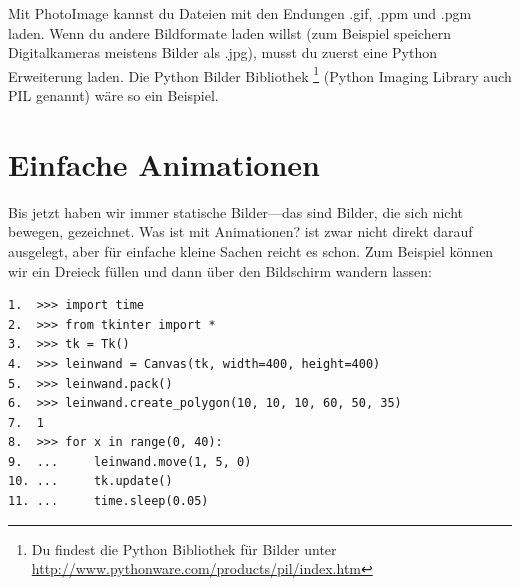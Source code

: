 Mit PhotoImage kannst du Dateien mit den Endungen .gif, .ppm und .pgm laden. Wenn du andere Bildformate laden willst (zum Beispiel speichern Digitalkameras meistens Bilder als .jpg), musst du zuerst eine Python Erweiterung laden. Die Python Bilder Bibliothek \footnote{Du findest die Python Bibliothek für Bilder unter \href{http://www.pythonware.com/products/pil/index.htm}{http://www.pythonware.com/products/pil/index.htm}} (Python Imaging Library auch PIL genannt) wäre so ein Beispiel.


\section{Einfache Animationen}

Bis jetzt haben wir immer statische Bilder---das sind Bilder, die sich nicht bewegen, gezeichnet. Was ist mit Animationen?  ist zwar nicht direkt darauf ausgelegt, aber für einfache kleine Sachen reicht es schon. Zum Beispiel können wir ein Dreieck füllen und dann über den Bildschirm wandern lassen:

\begin{Verbatim}[frame=single]
1.  >>> import time
2.  >>> from tkinter import *
3.  >>> tk = Tk()
4.  >>> leinwand = Canvas(tk, width=400, height=400)
5.  >>> leinwand.pack()
6.  >>> leinwand.create_polygon(10, 10, 10, 60, 50, 35)
7.  1
8.  >>> for x in range(0, 40):
9.  ...     leinwand.move(1, 5, 0)
10. ...     tk.update()
11. ...     time.sleep(0.05)
\end{Verbatim}

